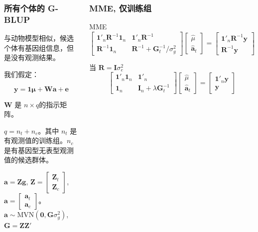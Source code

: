 \documentclass[serif,aspectratio=169]{beamer}
\begin{document}
\begin{frame}
\begin{columns}
\begin{frame}
  \frametitle{所有个体的 G-BLUP}
  与动物模型相似，候选个体有基因组信息，但是没有观测结果。

  我们假定：

  $$\mathbf{y=1\mu+Wa+e}$$

  $\mathbf{W}$ 是 $n\times q$的指示矩阵。

  $q=n_t+n_c$。其中 $n_t$ 是有观测值的训练组。$n_c$ 是有基因型无表型观测值的候选群体。

  $\mathbf{a=Zg}$, $\mathbf{Z}=\left[\begin{array}{c}\mathbf{Z}_t\\\mathbf{Z}_c\end{array}\right]$, $\mathbf{a} = \left[\begin{array}{c}\mathbf{a}_t\\\mathbf{a}_c\end{array}\right]$。  \pause$\mathbf{a}\sim\mathrm{MVN}(\mathbf{0,G}\sigma_g^2)$, $\mathbf{G=ZZ}'$
\end{frame}


\begin{frame}
  \frametitle{MME, 仅训练组}
  \begin{block}{MME}
    $$
    \left[\begin{array}{ll}
        \mathbf{1}'_n\mathbf{R}^{-1}\mathbf{1}_n & \mathbf{1}'_n\mathbf{R}^{-1}\\
        \mathbf{R}^{-1}\mathbf{1}_n & \mathbf{R}^{-1}+\mathbf{G}^{-1}_t/\sigma_g^2
      \end{array}\right]
    \left[\begin{array}{c}
        \hat{\mu}\\\hat{\mathbf{a}}_t
      \end{array}\right]=
    \left[\begin{array}{c}
        \mathbf{1}'_n\mathbf{R}^{-1}\mathbf{y}\\\mathbf{R}^{-1}\mathbf{y}
      \end{array}\right]
    $$
  \end{block}
  
  \begin{block}{当 $\mathbf{R=I}\sigma_e^2$}
    $$
    \left[\begin{array}{ll}
        \mathbf{1}'_n\mathbf{1}_n & \mathbf{1}'_n\\
        \mathbf{1}_n & \mathbf{I}_n+\lambda\mathbf{G}^{-1}_t
      \end{array}\right]
    \left[\begin{array}{c}
        \hat{\mu}\\\hat{\mathbf{a}}_t
      \end{array}\right]=
    \left[\begin{array}{c}
        \mathbf{1}'_n\mathbf{y}\\\mathbf{y}
      \end{array}\right]
    $$


\end{block}
\end{frame}
\end{columns}
\end{frame}
\end{document}
